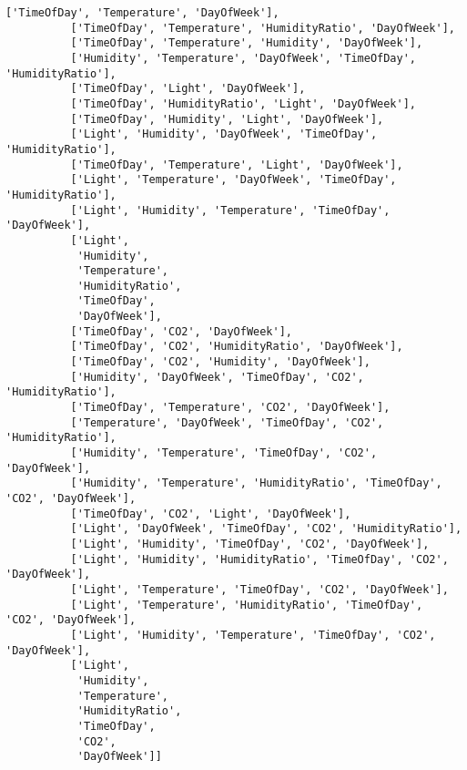 \documentclass[11pt]{article}
\begin{document}
\begin{Verbatim}[commandchars=\\\{\}]
          ['TimeOfDay', 'Temperature', 'DayOfWeek'],
          ['TimeOfDay', 'Temperature', 'HumidityRatio', 'DayOfWeek'],
          ['TimeOfDay', 'Temperature', 'Humidity', 'DayOfWeek'],
          ['Humidity', 'Temperature', 'DayOfWeek', 'TimeOfDay', 'HumidityRatio'],
          ['TimeOfDay', 'Light', 'DayOfWeek'],
          ['TimeOfDay', 'HumidityRatio', 'Light', 'DayOfWeek'],
          ['TimeOfDay', 'Humidity', 'Light', 'DayOfWeek'],
          ['Light', 'Humidity', 'DayOfWeek', 'TimeOfDay', 'HumidityRatio'],
          ['TimeOfDay', 'Temperature', 'Light', 'DayOfWeek'],
          ['Light', 'Temperature', 'DayOfWeek', 'TimeOfDay', 'HumidityRatio'],
          ['Light', 'Humidity', 'Temperature', 'TimeOfDay', 'DayOfWeek'],
          ['Light',
           'Humidity',
           'Temperature',
           'HumidityRatio',
           'TimeOfDay',
           'DayOfWeek'],
          ['TimeOfDay', 'CO2', 'DayOfWeek'],
          ['TimeOfDay', 'CO2', 'HumidityRatio', 'DayOfWeek'],
          ['TimeOfDay', 'CO2', 'Humidity', 'DayOfWeek'],
          ['Humidity', 'DayOfWeek', 'TimeOfDay', 'CO2', 'HumidityRatio'],
          ['TimeOfDay', 'Temperature', 'CO2', 'DayOfWeek'],
          ['Temperature', 'DayOfWeek', 'TimeOfDay', 'CO2', 'HumidityRatio'],
          ['Humidity', 'Temperature', 'TimeOfDay', 'CO2', 'DayOfWeek'],
          ['Humidity', 'Temperature', 'HumidityRatio', 'TimeOfDay', 'CO2', 'DayOfWeek'],
          ['TimeOfDay', 'CO2', 'Light', 'DayOfWeek'],
          ['Light', 'DayOfWeek', 'TimeOfDay', 'CO2', 'HumidityRatio'],
          ['Light', 'Humidity', 'TimeOfDay', 'CO2', 'DayOfWeek'],
          ['Light', 'Humidity', 'HumidityRatio', 'TimeOfDay', 'CO2', 'DayOfWeek'],
          ['Light', 'Temperature', 'TimeOfDay', 'CO2', 'DayOfWeek'],
          ['Light', 'Temperature', 'HumidityRatio', 'TimeOfDay', 'CO2', 'DayOfWeek'],
          ['Light', 'Humidity', 'Temperature', 'TimeOfDay', 'CO2', 'DayOfWeek'],
          ['Light',
           'Humidity',
           'Temperature',
           'HumidityRatio',
           'TimeOfDay',
           'CO2',
           'DayOfWeek']]
\end{Verbatim}
            
\end{document}
